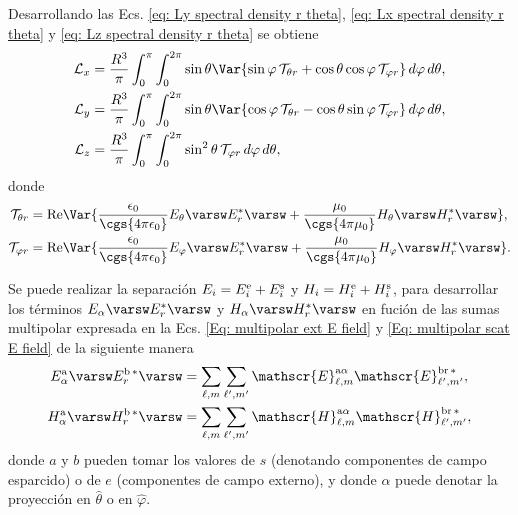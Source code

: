 Desarrollando las Ecs. \eqref{eq: Ly spectral density r theta}, \eqref{eq: Lx spectral density r theta} y \eqref{eq: Lz spectral density r theta} se obtiene
%
\begin{align}
\mathcal{L}_x &= \frac{R^3}{\pi}\int_0^{\pi}\int_0^{2\pi} \sin\theta \Var{\sin\varphi \,\mathcal{T}_{\theta r} + \cos\theta\cos\varphi\,\mathcal{T}_{\varphi r}} \,d\varphi \, d\theta, \label{eq: Lx spectral integral angles}\\
\mathcal{L}_y &= \frac{R^3}{\pi}\int_0^{\pi}\int_0^{2\pi} \sin\theta \Var{\cos\varphi \,\mathcal{T}_{\theta r} - \cos\theta\sin\varphi\,\mathcal{T}_{\varphi r}} \,d\varphi \, d\theta, \label{eq: Ly spectral integral angles}\\
\mathcal{L}_z &= \frac{R^3}{\pi}\int_0^{\pi}\int_0^{2\pi} \sin^{2}\theta \, \mathcal{T}_{\varphi r} \,d\varphi \, d\theta, \label{eq: Lz spectral integral angles}
\end{align}
% 
donde 
\begin{align}
\mathcal{T}_{\theta r} &= {\rm Re}\Var{\frac{\epsilon_0}{\cgs{4\pi\epsilon_0}} E_{\theta}\varsw E_{r}^{*}\varsw + \frac{\mu_0}{\cgs{4\pi\mu_0}} H_{\theta}\varsw H_{r}^{*}\varsw  },\\
\mathcal{T}_{\varphi r} &= {\rm Re}\Var{\frac{\epsilon_0}{\cgs{4\pi\epsilon_0}} E_{\varphi}\varsw E_{r}^{*}\varsw + \frac{\mu_0}{\cgs{4\pi\mu_0}} H_{\varphi}\varsw H_{r}^{*}\varsw  }.
\end{align}

Se puede realizar la separación $E_i=E_i^{\rm e}+E_i^{\rm s}$ y $H_i=H_i^{\rm e}+H_i^{\rm s}$, para desarrollar los términos $E_{\alpha}\varsw E_{r}^{*}\varsw$ y $H_{\alpha}\varsw H_{r}^{*}\varsw$ en fución de las sumas multipolar expresada en la Ecs. \eqref{Eq: multipolar ext E field} y \eqref{Eq: multipolar scat E field} de la siguiente manera
\begin{align}
E^{\rm a}_{\alpha}\varsw E_{r}^{\rm b \,*}\varsw &= \sum_{\ell, m} \sum_{\ell^{\prime}, m^{\prime}} \mathscr{E}_{\ell, m}^{\text{a}\alpha}\mathscr{E}_{\ell^{\prime}, m^{\prime}}^{\text{br}\,*},\label{eq: cross terms E field}\\
H^{\rm a}_{\alpha}\varsw H_{r}^{\rm b \,*}\varsw &= \sum_{\ell, m} \sum_{\ell^{\prime}, m^{\prime}} \mathscr{H}_{\ell, m}^{\text{a}\alpha}\mathscr{H}_{\ell^{\prime}, m^{\prime}}^{\text{br}\,*},\label{eq: cross terms H field}
\end{align}
donde $a$ y $b$ pueden tomar los valores de $s$ (denotando componentes de campo esparcido) o de $e$ (componentes de campo externo), y donde $\alpha$ puede denotar la proyección en $\hat{ \theta}$ o en $\hat{\varphi}$. 

